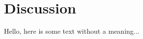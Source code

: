 \documentclass[../main.tex]{subfiles}
\begin{document}
\section{Discussion}
Hello, here is some text without a meaning...
\end{document}
